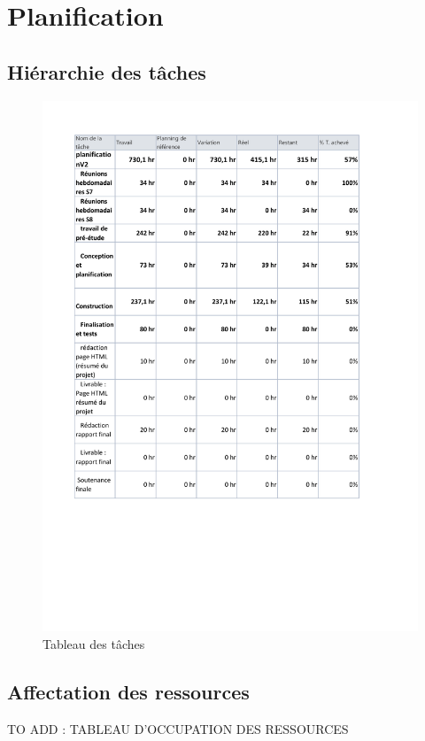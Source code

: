 \chapter{Planification}

\section{Hiérarchie des tâches}

\begin{figure}[H]
	\centering
	\includegraphics[scale=0.7]{images/taches.pdf}
	\caption{Tableau des tâches}
\end{figure}

\section{Affectation des ressources}
TO ADD : TABLEAU D'OCCUPATION DES RESSOURCES


